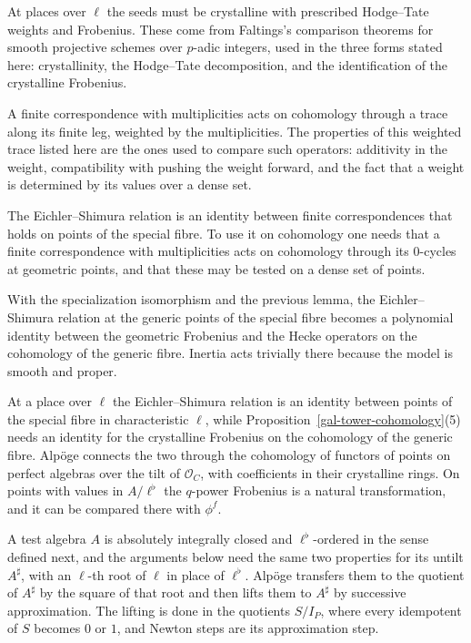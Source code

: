 At places over $\ell$ the seeds must be crystalline with prescribed Hodge--Tate weights and Frobenius.
These come from Faltings's comparison theorems for smooth projective schemes over $p$-adic integers,
used in the three forms stated here: crystallinity, the Hodge--Tate decomposition, and the identification
of the crystalline Frobenius.

A finite correspondence with multiplicities acts on cohomology through a trace along its finite leg,
weighted by the multiplicities. The properties of this weighted trace listed here are the ones used to
compare such operators: additivity in the weight, compatibility with pushing the weight forward, and
the fact that a weight is determined by its values over a dense set.

The Eichler--Shimura relation is an identity between finite correspondences that holds on points of the
special fibre. To use it on cohomology one needs that a finite correspondence with multiplicities acts on
cohomology through its $0$-cycles at geometric points, and that these may be tested on a dense set of
points.

With the specialization isomorphism and the previous lemma, the Eichler--Shimura relation at the generic
points of the special fibre becomes a polynomial identity between the geometric Frobenius and the Hecke
operators on the cohomology of the generic fibre. Inertia acts trivially there because the model is
smooth and proper.

At a place over $\ell$ the Eichler--Shimura relation is an identity between points of the special
fibre in characteristic $\ell$, while Proposition~\ref{gal-tower-cohomology}(5) needs an identity for
the crystalline Frobenius on the cohomology of the generic fibre. Alpöge connects the two through the
cohomology of functors of points on perfect algebras over the tilt of $\mathcal O_C$, with coefficients
in their crystalline rings. On points with values in $A/\ell^\flat$ the $q$-power Frobenius is a natural
transformation, and it can be compared there with $\phi^f$.

A test algebra $A$ is absolutely integrally closed and $\ell^\flat$-ordered in the sense defined next,
and the arguments below need the same two properties for its untilt $A^\sharp$, with an $\ell$-th root
of $\ell$ in place of $\ell^\flat$. Alpöge transfers them to the quotient of $A^\sharp$ by the square of
that root and then lifts them to $A^\sharp$ by successive approximation. The lifting is done in the
quotients $S/I_P$, where every idempotent of $S$ becomes $0$ or $1$, and Newton steps are its
approximation step.

